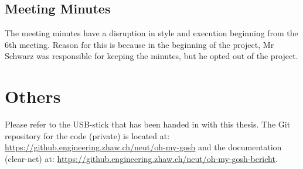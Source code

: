 \documentclass[10pt,a4paper,titlepage,twoside,english,final]{zhawreprt}
\begin{document}
\subsection{Meeting Minutes}\label{ssec:MeetingMinutes}
The meeting minutes have a disruption in style and execution beginning from the 6th meeting.
Reason for this is because in the beginning of the project, Mr Schwarz was responsible for keeping the minutes, but he opted out of the project.












\section{Others}\label{sec:Others}
Please refer to the USB-stick that has been handed in with this thesis.
The Git repository for the code (private) is located at:
\url{https://github.engineering.zhaw.ch/neut/oh-my-gosh}
and the documentation (clear-net) at:
\url{https://github.engineering.zhaw.ch/neut/oh-my-gosh-bericht}.
\end{document}
